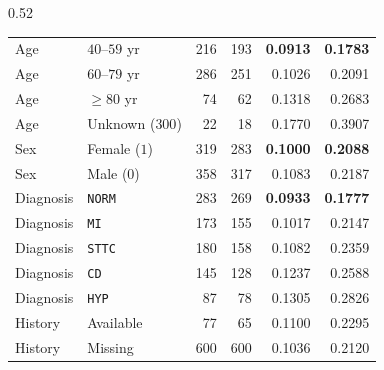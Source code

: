 \documentclass[11pt,a4paper]{article}
\begin{document}
\begin{table}[H]
\begin{subtable}[t]{0.52\textwidth}
{\begin{tabular}{llrrrr}
Age & $40\text{--}59$ yr & 216 & 193 & \textbf{0.0913} & \textbf{0.1783} \\
Age & $60\text{--}79$ yr & 286 & 251 & 0.1026 & 0.2091 \\
Age & $\ge 80$ yr & 74 & 62 & 0.1318 & 0.2683 \\
Age & Unknown ($300$) & 22 & 18 & 0.1770 & 0.3907 \\
\midrule
Sex & Female ($1$) & 319 & 283 & \textbf{0.1000} & \textbf{0.2088} \\
Sex & Male ($0$) & 358 & 317 & 0.1083 & 0.2187 \\
\midrule
Diagnosis & \texttt{NORM} & 283 & 269 & \textbf{0.0933} & \textbf{0.1777} \\
Diagnosis & \texttt{MI} & 173 & 155 & 0.1017 & 0.2147 \\
Diagnosis & \texttt{STTC} & 180 & 158 & 0.1082 & 0.2359 \\
Diagnosis & \texttt{CD} & 145 & 128 & 0.1237 & 0.2588 \\
Diagnosis & \texttt{HYP} & 87 & 78 & 0.1305 & 0.2826 \\
\midrule
History & Available & 77 & 65 & 0.1100 & 0.2295 \\
History & Missing & 600 & 600 & 0.1036 & 0.2120 \\
\bottomrule
\end{tabular}}
\end{subtable}
\end{table}
\end{document}
